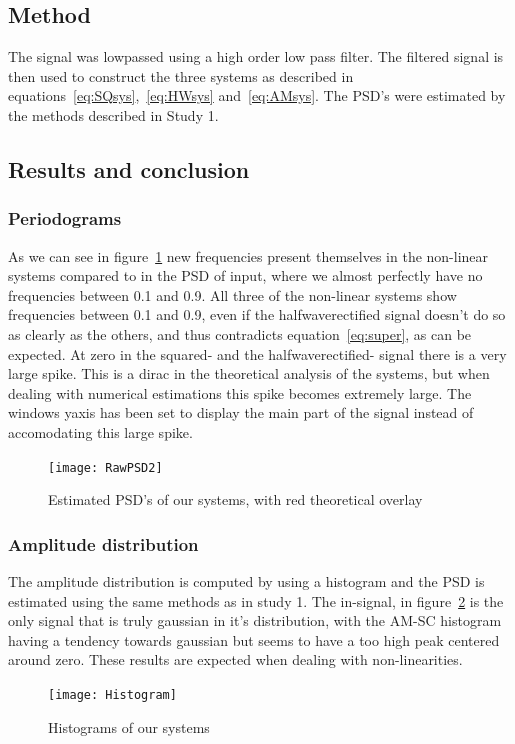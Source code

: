\documentclass[10pt]{article}
\begin{document}
\subsection{Method}
The signal was lowpassed using a high order low pass filter. The filtered signal
is then used to construct the three systems as described in
equations~\ref{eq:SQsys},~\ref{eq:HWsys} and~\ref{eq:AMsys}.
The PSD's were estimated by the methods described in Study 1.

\subsection{Results and conclusion}

\subsubsection{Periodograms}
As we can see in figure~\ref{fig:RawPSD2} new frequencies present themselves in
the non-linear systems compared to in the PSD of input, where we almost perfectly
have no frequencies between 0.1 and 0.9. All three of the non-linear systems show
frequencies between 0.1 and 0.9, even if the halfwaverectified signal doesn't do
so as clearly as the others, and thus contradicts equation~\ref{eq:super}, as can
be expected. At zero in the squared- and the halfwaverectified-
signal there is a very large spike. This is a dirac in the theoretical analysis
of the systems, but when dealing with numerical estimations this spike becomes
extremely large. The windows yaxis has been set to display the main part of the
signal instead of accomodating this large spike.


\begin{figure}[!hp]

    \begin{center}
      \texttt{[image: RawPSD2]}
    \caption{Estimated PSD's of our systems, with red theoretical overlay \label{fig:RawPSD2}}
    \end{center}

\end{figure}

\subsubsection{Amplitude distribution}
The amplitude distribution is computed by using a histogram and the PSD
is estimated using the same methods as in study 1.
The in-signal, in figure~\ref{fig:hist} is the only signal that is truly gaussian in it's distribution,
with the AM-SC histogram having a tendency towards gaussian but seems to have a
too high peak centered around zero. These results are expected when dealing with
non-linearities.

\begin{figure}[!hp]

    \begin{center}
      \texttt{[image: Histogram]}
    \caption{Histograms of our systems \label{fig:hist}}
    \end{center}

\end{figure}


\clearpage
\end{document}
